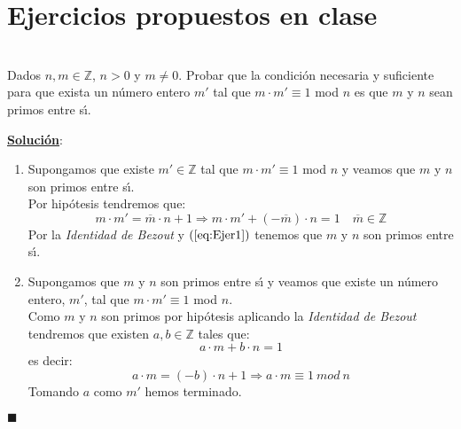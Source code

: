 %
%

\chapter{Ejercicios propuestos en clase}

\begin{ejercicio}
\ \\
Dados $n,m\in \mathbb{Z}$, $n>0$ y $m\neq 0$. Probar que la
condici\'on necesaria y suficiente para que exista un n\'umero entero $m'$
tal que $m\cdot m' \equiv 1$ mod $n$ es que $m$ y $n$ sean primos entre
s\'{\i}.
\end{ejercicio}
\underline{\textbf{Soluci\'on}}:
\begin{enumerate}
\item Supongamos que existe $m'\in \mathbb{Z}$ tal que $m\cdot m' \equiv 1$
mod $n$ y veamos que $m$ y $n$ son primos entre s\'{\i}.\\

Por hip\'otesis tendremos que:
\begin{equation}\label{eq:Ejer1}
m\cdot m' = \overline{m}\cdot n +1 \Longrightarrow m\cdot m' +(-\overline{m})
\cdot n = 1\quad \overline{m} \in \mathbb{Z}
\end{equation}
Por la \emph{Identidad de Bezout} y $(\ref{eq:Ejer1})$ tenemos que $m$ y $n$ son
primos entre s\'{\i}.

\item Supongamos que $m$ y $n$ son primos entre s\'{\i} y veamos que existe un
n\'umero entero, $m'$, tal que $m\cdot m'\equiv 1$ mod $n$.\\

Como $m$ y $n$ son primos por hip\'otesis aplicando la \emph{Identidad de
Bezout} tendremos que existen $a,b\in\mathbb{Z}$ tales que:
\begin{displaymath}
a\cdot m + b\cdot n = 1
\end{displaymath}
es decir:
\begin{displaymath}
a\cdot m = (-b)\cdot n +1 \Longrightarrow a\cdot m \equiv 1\ mod\ n
\end{displaymath}
Tomando $a$ como $m'$ hemos terminado.
\end{enumerate}
\begin{flushright}
$\blacksquare$
\end{flushright}

%
%


